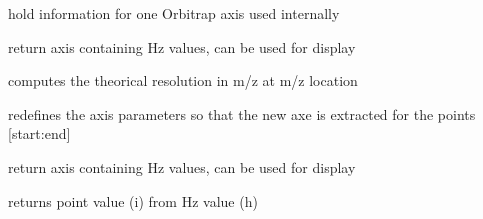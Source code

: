 \documentclass[letterpaper,10pt,openany,oneside]{sphinxmanual}
\begin{document}
\begin{fulllineitems}
\label{rst/code:Orbitrap.OrbiAxis}
hold information for one Orbitrap axis
used internally

\begin{fulllineitems}
\label{rst/code:Orbitrap.OrbiAxis.Hz_axis}
return axis containing Hz values, can be used for display

\end{fulllineitems}


\begin{fulllineitems}
\label{rst/code:Orbitrap.OrbiAxis.deltamz}
computes the theorical resolution in m/z at m/z location

\end{fulllineitems}


\begin{fulllineitems}
\label{rst/code:Orbitrap.OrbiAxis.extract}
redefines the axis parameters so that the new axe is extracted for the points {[}start:end{]}

\end{fulllineitems}


\begin{fulllineitems}
\label{rst/code:Orbitrap.OrbiAxis.freq_axis}
return axis containing Hz values, can be used for display

\end{fulllineitems}


\begin{fulllineitems}
\label{rst/code:Orbitrap.OrbiAxis.htoi}
returns point value (i) from Hz value (h)


\end{fulllineitems}
\end{fulllineitems}
\end{document}
